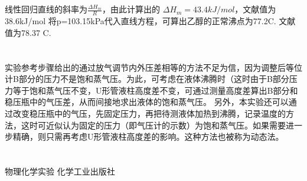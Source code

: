 \documentclass[10.5pt]{ctexart}
\begin{document}
\subsection{\textbf{}}

线性回归直线的斜率为$\frac{\Delta H_m}{R}$，由此计算出的
$\Delta H_m =43.4kJ/mol$，文献值为38.6kJ/mol
将p=103.15kPa代入直线方程，可算出乙醇的正常沸点为77.2\degree C.
文献值为78.37 \degree C.
\section{\textbf{}}
实验参考步骤给出的通过放气调节内外压差相等的方法不足为信，因为调整后等位计B部分的压力不是饱和蒸气压。为此，可考虑在液体沸腾时（这时由于B部分压力等于饱和蒸气压不变，U形管液柱高度差不变，可通过测量高度差算出B部分和稳压瓶中的气压差，从而间接地求出液体的饱和蒸气压。
另外，本实验还可以通过改变稳压瓶中的气压，先固定压力，再把待测液体加热到沸腾，记录温度的方法，这时可近似认为固定的压力（即气压计的示数）为饱和蒸气压。如果需要进一步精确，则只需再考虑U形管液柱高度差的影响。这种方法也被称为动态法。
\section{\textbf{}}
\begin{thebibliography}{}
物理化学实验 \quad 化学工业出版社
\end{thebibliography}
\end{document}
